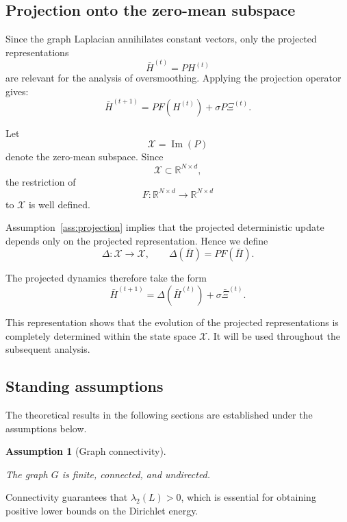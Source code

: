 \documentclass{article}
\newtheorem{assumption}{Assumption}[section]
\begin{document}
\subsection{Projection onto the zero-mean subspace}

Since the graph Laplacian annihilates constant vectors,
only the projected representations
\[
\bar H^{(t)}
=
PH^{(t)}
\]
are relevant for the analysis of oversmoothing.
Applying the projection operator gives:
\[
\bar H^{(t+1)}
=
PF(H^{(t)})
+
\sigma
P\Xi^{(t)}.
\]

Let
\[
\mathcal X=\operatorname{Im}(P)
\]
denote the zero-mean subspace. Since
\[
\mathcal X\subset\mathbb R^{N\times d},
\]
the restriction of
\[
F:\mathbb R^{N\times d}\to\mathbb R^{N\times d}
\]
to \(\mathcal X\) is well defined.

Assumption~\ref{ass:projection} implies that the projected deterministic
update depends only on the projected representation. Hence we define
\[
\Delta:\mathcal X\rightarrow\mathcal X,
\qquad
\Delta(\bar H)=PF(\bar H).
\]

The projected dynamics therefore take the form
\[
\boxed{
	\bar H^{(t+1)}
	=
	\Delta(\bar H^{(t)})
	+
	\sigma\bar\Xi^{(t)}.
}
\]

This representation shows that the evolution of the projected
representations is completely determined within the state space
\(\mathcal X\).
It will be used throughout the subsequent analysis.

\subsection{Standing assumptions}

The theoretical results in the following sections are established under
the assumptions below.

\begin{assumption}[Graph connectivity]
	\label{ass:connected}
	
	The graph
	$G$
	is finite,
	connected,
	and undirected.	
\end{assumption}

Connectivity guarantees that
\(\lambda_2(L)>0\),
which is essential for obtaining positive lower bounds on the Dirichlet
energy.
\end{document}

